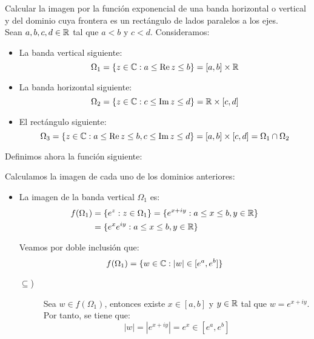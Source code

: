 \begin{ejercicio}
    Calcular la imagen por la función exponencial de una banda horizontal o vertical y del dominio cuya frontera es un rectángulo de lados paralelos a los ejes.\\

    Sean $a,b,c,d\in \mathbb{R}$ tal que $a<b$ y $c<d$. Consideramos:
    \begin{itemize}
        \item La banda vertical siguiente:
        \begin{equation*}
            \Omega_1 = \{z\in \mathbb{C} : a \leq \operatorname{Re} z \leq b\} = [a,b]\times \mathbb{R}
        \end{equation*}

        \item La banda horizontal siguiente:
        \begin{equation*}
            \Omega_2 = \{z\in \mathbb{C} : c \leq \operatorname{Im} z \leq d\} = \mathbb{R}\times [c,d]
        \end{equation*}

        \item El rectángulo siguiente:
        \begin{equation*}
            \Omega_3 = \{z\in \mathbb{C} : a \leq \operatorname{Re} z \leq b, c \leq \operatorname{Im} z \leq d\} = [a,b]\times [c,d] = \Omega_1\cap \Omega_2
        \end{equation*}
    \end{itemize}

    Definimos ahora la función siguiente:

    Calculamos la imagen de cada uno de los dominios anteriores:
    \begin{itemize}
        \item La imagen de la banda vertical $\Omega_1$ es:
        \begin{align*}
            f(\Omega_1) &= \{e^z : z\in \Omega_1\} = \{e^{x+iy} : a\leq x\leq b, y\in \mathbb{R}\} \\
            &= \{e^x e^{iy} : a\leq x\leq b, y\in \mathbb{R}\}
        \end{align*}

        Veamos por doble inclusión que:
        \begin{equation*}
            f(\Omega_1) = \{w\in \mathbb{C} : |w|\in [e^a,e^b]\}
        \end{equation*}
        \begin{description}
            \item[$\subseteq$)] Sea $w\in f(\Omega_1)$, entonces existe $x\in [a,b]$ y $y\in \mathbb{R}$ tal que $w = e^{x+iy}$. Por tanto, se tiene que:
            \begin{equation*}
                |w| = |e^{x+iy}| = e^x \in [e^a,e^b]
            \end{equation*}
            

\end{description}
\end{itemize}
\end{ejercicio}
